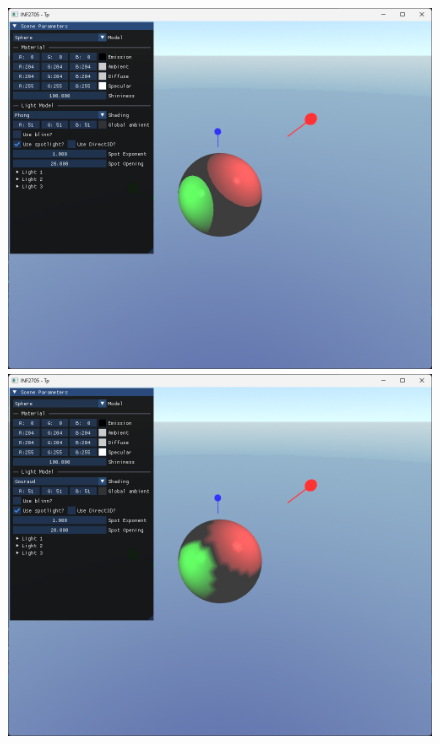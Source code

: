 \documentclass{article}[letterpaper, 11pt]
\begin{document}
\begin{figure}[ht]
	\begin{minipage}[c]{.33\linewidth}
		 \centering
		 \includegraphics[scale = 0.16]{image_9.png}
	\end{minipage}
	\begin{minipage}[c]{.33\linewidth}
		 \centering
		 \includegraphics[scale = 0.16]{image_10.png}
	\end{minipage}
	\begin{minipage}[c]{.33\linewidth}

\end{minipage}
\end{figure}
\end{document}

